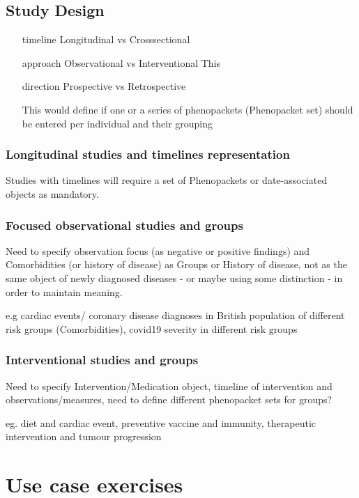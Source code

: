 \documentclass[a4paper, 10pt]{article}        %
\begin{document}
\subsection{Study Design}
\begin{itemize}
\item[timeline] Longitudinal vs Crosssectional
\item[approach] Observational vs Interventional
This 
\item[direction] Prospective vs Retrospective

This would define if one or a series of phenopackets (Phenopacket set) should be entered per individual and their grouping

\end{itemize}


\subsubsection{Longitudinal studies and timelines representation}
Studies with timelines will require a set of Phenopackets or date-associated objects as mandatory.

\subsubsection{Focused observational studies and groups} 
Need to specify observation focus (as negative or positive findings) and Comorbidities (or history of disease) as Groups or History of disease, not as the same object of newly diagnosed diseases - or maybe using some distinction - in order to maintain meaning.

e.g cardiac events/ coronary disease diagnoses in British population of different risk groups (Comorbidities), covid19 severity in different risk groups

\subsubsection{Interventional studies and groups}
Need to specify Intervention/Medication object, timeline of intervention and observations/measures, need to define different phenopacket sets for groups?

eg. diet and cardiac event, preventive vaccine and immunity, therapeutic intervention and tumour progression


\section{Use case exercises}
\end{document}
